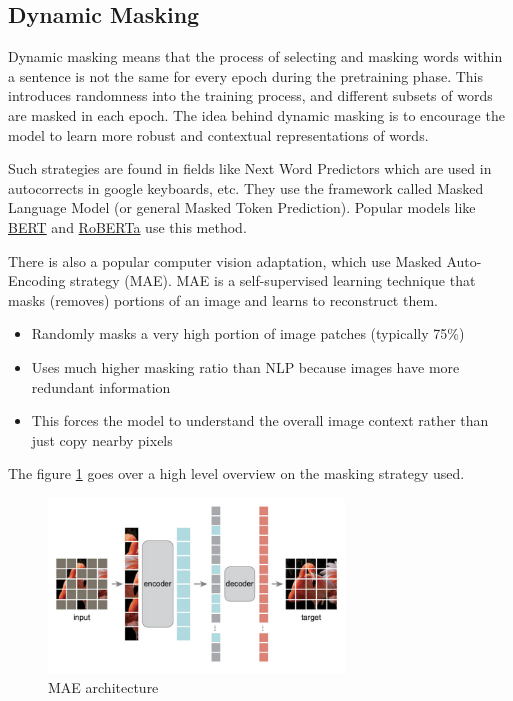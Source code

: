 \documentclass[letterpaper,12pt]{article}
\begin{document}
\begin{spacing}{1.125}
\subsection{Dynamic Masking}

Dynamic masking means that the process of selecting and masking words within a sentence is not the same for every epoch during the pretraining phase. This introduces randomness into the training process, and different subsets of words are masked in each epoch. The idea behind dynamic masking is to encourage the model to learn more robust and contextual representations of words.

Such strategies are found in fields like Next Word Predictors which are used in
autocorrects in google keyboards, etc. They use the framework called Masked
Language Model (or general Masked Token Prediction). Popular models like
\href{https://arxiv.org/abs/1810.04805}{BERT}
and \href{https://arxiv.org/abs/1907.11692}{RoBERTa} use this method.

There is also a popular computer vision adaptation, which use Masked
Auto-Encoding strategy (MAE).
MAE is a self-supervised learning technique that masks (removes) portions of an
image and
learns to reconstruct them.

\begin{itemize}
  \item Randomly masks a very high portion of image patches
(typically 75\%)
\item Uses much higher masking ratio than NLP because
images have more redundant information
\item This forces the model to understand the overall image
context rather than just copy nearby pixels
\end{itemize}

The figure \ref{mae} goes over a high level overview on the masking strategy
used.


\begin{figure}[!htb]
  \includegraphics[width=0.7\textwidth]{mae.jpeg}
  \caption{MAE architecture}
  \label{mae}
\end{figure}


\end{spacing}
\end{document}
